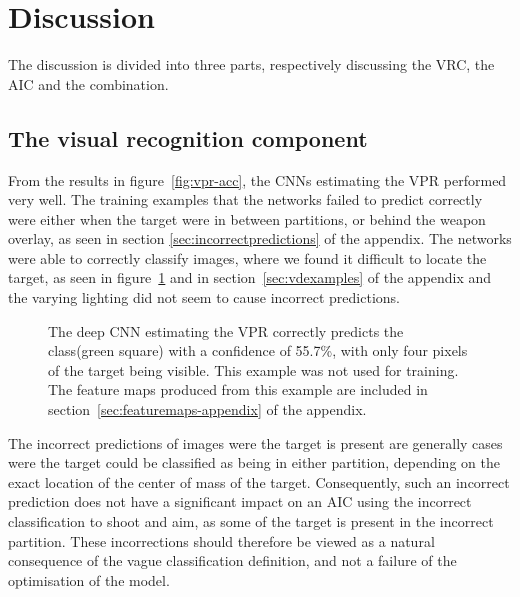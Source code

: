 
\section{Discussion}
\label{sec:discussion}
The discussion is divided into three parts, respectively discussing the VRC, the AIC and the combination.

\subsection{The visual recognition component}
From the results in figure~\ref{fig:vpr-acc}, the CNNs estimating the VPR performed very well. The training examples that the networks failed to predict correctly were either when the target were in between partitions, or behind the weapon overlay, as seen in section \ref{sec:incorrectpredictions} of the appendix. The networks were able to correctly classify images, where we found it difficult to locate the target, as seen in figure~\ref{fig:hardprediction} and in section~\ref{sec:vdexamples} of the appendix and the varying lighting did not seem to cause incorrect predictions.

\begin{figure}[H]
	\begin{scriptsize}
		\sffamily
		\def\svgwidth{\textwidth}
		
	\end{scriptsize}
	\caption[Difficult VPR classification example]{The deep CNN estimating the VPR correctly predicts the class(green square) with a confidence of 55.7\%, with only four pixels of the target being visible. This example was not used for training. The feature maps produced from this example are included in section~\ref{sec:featuremaps-appendix} of the appendix.}
	\label{fig:hardprediction}
\end{figure}

The incorrect predictions of images were the target is present are generally cases were the target could be classified as being in either partition, depending on the exact location of the center of mass of the target. Consequently, such an incorrect prediction does not have a significant impact on an AIC using the incorrect classification to shoot and aim, as some of the target is present in the incorrect partition. These incorrections should therefore be viewed as a natural consequence of the vague classification definition, and not a failure of the optimisation of the model.

